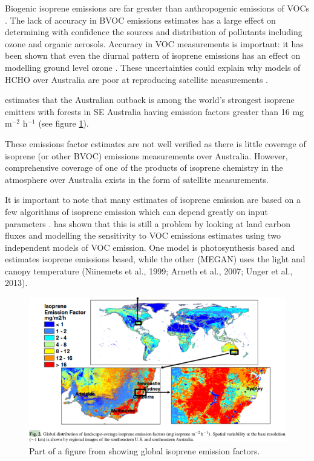     Biogenic isoprene emissions are far greater than anthropogenic emissions of VOCs \citep{Guenther2006, Kefauver2014}. 
    The lack of accuracy in BVOC emissions estimates has a large effect on determining with confidence the sources and distribution of pollutants including ozone and organic aerosols.
    Accuracy in VOC measurements is important: it has been shown that even the diurnal pattern of isoprene emissions has an effect on modelling ground level ozone \citep{Hewitt_2011,Fan_2004}.
    These uncertainties could explain why models of HCHO over Australia are poor at reproducing satellite measurements \citep{Stavrakou2009}.

    \citet{Guenther2006} estimates that the Australian outback is among the world's strongest isoprene emitters with forests in SE Australia having emission factors greater than 16 mg m$^{-2}$ h$^{-1}$ (see figure \ref{ch1:fig:meganisoprene}).

    These emissions factor estimates are not well verified as there is little coverage of isoprene (or other BVOC) emissions measurements over Australia. However, comprehensive coverage of one of the products of isoprene chemistry in the atmosphere over Australia exists in the form of satellite measurements. 
    
    It is important to note that many estimates of isoprene emission are based on a few algorithms of isoprene emission which can depend greatly on input parameters \citep{Niinemets2010}.
    \citet{Yue2015} has shown that this is still a problem by looking at land carbon fluxes and modelling the sensitivity to VOC emissions estimates using two independent models of VOC emission.
    One model is photosynthesis based and estimates isoprene emissions based, while the other (MEGAN) uses the light and canopy temperature (Niinemets et al., 1999; Arneth et al., 2007; Unger et al., 2013).
    
    \begin{figure}
      \includegraphics{Figures/MeganIsoprene1.png}
      \caption{ Part of a figure from \citet{Guenther2006} showing global isoprene emission factors. }
      \label{ch1:fig:meganisoprene}
    \end{figure}
    
